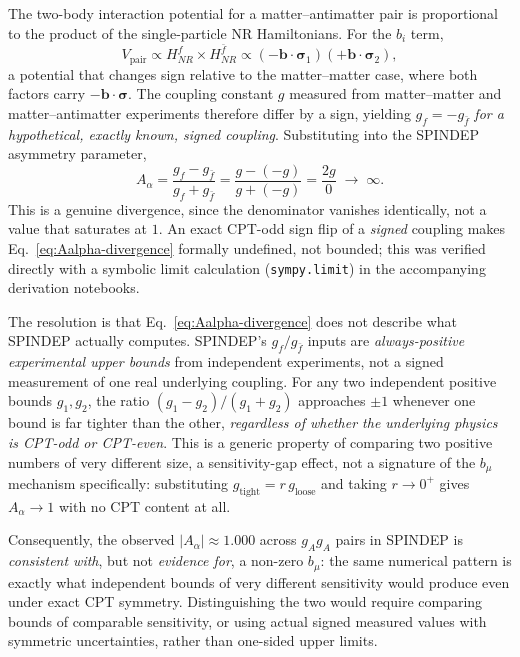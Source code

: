 \documentclass[main]{subfiles}
\begin{document}
The two-body interaction potential for a matter--antimatter pair is
proportional to the product of the single-particle NR Hamiltonians. For the
$b_i$ term,
\begin{equation}
  V_{\text{pair}} \propto H_{NR}^{f}\times H_{NR}^{\bar f}
  \propto (-\mathbf b\cdot\boldsymbol\sigma_1)(+\mathbf b\cdot\boldsymbol\sigma_2),
\end{equation}
a potential that changes sign relative to the matter--matter case, where
both factors carry $-\mathbf b\cdot\boldsymbol\sigma$. The coupling constant
$g$ measured from matter--matter and matter--antimatter experiments
therefore differ by a sign, yielding $g_f=-g_{\bar f}$ \emph{for a
hypothetical, exactly known, signed coupling}. Substituting into the SPINDEP
asymmetry parameter,
\begin{equation}
  A_\alpha = \frac{g_f-g_{\bar f}}{g_f+g_{\bar f}}
  = \frac{g-(-g)}{g+(-g)} = \frac{2g}{0} \;\longrightarrow\; \infty.
  \label{eq:Aalpha-divergence}
\end{equation}
This is a genuine divergence, since the denominator vanishes identically, not a
value that saturates at $1$. An exact CPT-odd sign flip of a \emph{signed}
coupling makes Eq.~\eqref{eq:Aalpha-divergence} formally undefined, not
bounded; this was verified directly with a symbolic limit calculation
(\texttt{sympy.limit}) in the accompanying derivation notebooks.

The resolution is that Eq.~\eqref{eq:Aalpha-divergence} does not describe
what SPINDEP actually computes. SPINDEP's $g_f/g_{\bar f}$ inputs are
\emph{always-positive experimental upper bounds} from independent
experiments, not a signed measurement of one real underlying coupling. For
any two independent positive bounds $g_1,g_2$, the ratio
$(g_1-g_2)/(g_1+g_2)$ approaches $\pm1$ whenever one bound is far tighter
than the other, \emph{regardless of whether the underlying physics is
CPT-odd or CPT-even}. This is a generic property of comparing two positive
numbers of very different size, a sensitivity-gap effect, not a
signature of the $b_\mu$ mechanism specifically: substituting
$g_{\text{tight}}=r\,g_{\text{loose}}$ and taking $r\to0^+$ gives
$A_\alpha\to1$ with no CPT content at all.

Consequently, the observed $|A_\alpha|\approx1.000$ across $g_Ag_A$ pairs in
SPINDEP is \emph{consistent with}, but not \emph{evidence for}, a non-zero
$b_\mu$: the same numerical pattern is exactly what independent bounds of
very different sensitivity would produce even under exact CPT symmetry.
Distinguishing the two would require comparing bounds of comparable
sensitivity, or using actual signed measured values with symmetric
uncertainties, rather than one-sided upper limits.
\end{document}

